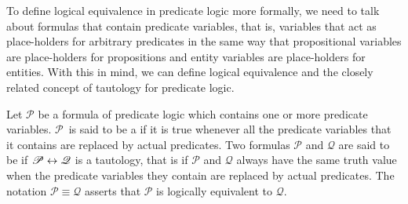 To define logical equivalence in predicate logic more formally,
we need to talk about formulas that contain predicate variables,
that is, variables that act as place-holders for arbitrary predicates
in the same way that propositional variables are place-holders for
propositions and entity variables are place-holders for
entities.  With this in mind, we can define logical equivalence
and the closely related concept of tautology for predicate logic.

\begin{definition}
Let $\mathscr{P}$ be a formula of predicate logic which contains one or more
predicate variables.  $\mathscr{P}$~is said to be a 
if it is true whenever all the predicate variables that it contains are replaced
by actual predicates.  Two formulas $\mathscr{P}$ and $\mathscr{Q}$ are
said to be  if $\mathscr{P}\leftrightarrow\mathscr{Q}$ is
a tautology, that is if $\mathscr{P}$ and $\mathscr{Q}$ always have the same
truth value when the predicate variables they contain are replaced by actual
predicates.  The notation $\mathscr{P}\equiv\mathscr{Q}$ asserts that
$\mathscr{P}$ is logically equivalent to $\mathscr{Q}$.
\end{definition}





